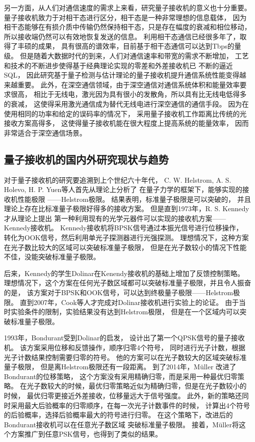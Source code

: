 另一方面，从人们对通信速度的需求上来看，研究量子接收机的意义也十分重要。
量子接收机致力于对相干态进行区分，相干态是一种非常理想的信息载体，
因为相干态能够在有损介质中传输仍然保持相干态，只是存在幅度的衰减和相位移动，
所以接收端仍然可以有效地恢复发送的信息。
利用相干态通信已经很多年了，取得了丰硕的成果，
具有很高的谱效率，目前基于相干态通信可以达到Tbps的量级\cite{jinno2007networks}。
但是随着大数据时代的到来，人们对通信速率和带宽的需求不断增加，
工艺和技术的不断进步使得基于经典理论实现的零差和外差接收机已
不断的逼近SQL\cite{tsukamoto2006unrepeated}，
因此研究基于量子检测与估计理论的量子接收机提升通信系统性能变得越来越重要。
此外，在深空通信领域，由于深空通信对通信系统体积和能量效率要求很高，
相比于无线电，激光因为具有很小的发散角，所以具有比无线电低得多的衰减，
这使得采用激光通信成为替代无线电进行深空通信的通信手段\cite{hemmati2006deep}。
因为在使用相同的功率和给定的误码率的情况下，
采用量子接收机工作距离比传统的光接收方案高得多\cite{helstrom1976quantum}，
这使得量子接收机能在很大程度上提高系统的能量效率，
因而非常适合于深空通信场景。



\subsection{量子接收机的国内外研究现状与趋势}
对于量子接收机的研究要追溯到上个世纪六十年代，
C. W. Helstrom, A. S. Holevo, H. P. Yuen等人首先从理论上分析了
在量子力学的框架下，能够实现的接收机性能极限
——Helstrom极限\cite{helstrom1976quantum,helstrom1967detection,yuen1970optimal,
yuen1975optimum,eldar2003designing}。
结果表明，标准量子极限是可以突破的，
并且理论上存在比标准量子极限好得多的接收方案。
但是直到1973年，R. S. Kennedy才从理论上提出
第一种利用现有的光学元器件可以实现的接收机方案——Kennedy接收机\cite{kennedy1973near}。
Kennedy接收机将BPSK信号通过本振光信号进行位移操作，
转化为OOK信号，然后利用单光子探测器进行光强探测。
理想情况下，这种方案在光子数比较大的区域可以突破标准量子极限，
但是在光子数较小的情况下性能不佳，没能突破标准量子极限。

后来，Kennedy的学生Dolinar在Kenendy接收机的基础上增加了反馈控制策略\cite{dolinar1973optimum}。
理想情况下，这个方案在任何光子数区域都可以突破标准量子极限，并且令人振奋的是，
该方案对于BPSK和OOK信号，可以达到终极量子极限——Helstrom极限。
直到2007年，Cook等人才完成对Dolinar接收机进行实验上的论证\cite{cook2007optical}。
由于当时实验条件的限制，实验结果没有达到Helstrom极限，
但是在一个区域内可以突破标准量子极限。

1993年，Bondurant受到Dolinar的启发，
设计出了第一个QPSK信号的量子接收机\cite{bondurant1993near}。
该方案采用位移和反馈操作，顺序归零4个符号，
同时进行光子计数，根据光子计数结果控制需要归零的符号。
他的方案可以在光子数较大的区域突破标准量子极限，
但是离Helstrom极限还有一段距离。
到了2014年，Müller 改进了Bondurant的位移策略，
这个方案没有采用精确归零，而是采用一种最优归零策略。
在光子数较大的时候，最优归零策略近似为精确归零，但是在光子数较小的时候，
最优归零更接近外差接收，位移量远大于信号强度。
此外，新的策略还同时采用最大后验概率的归零顺序，在每一次光子计数事件的时候，
计算出4个符号的后验概率，选择后验概率最大的符号进行归零。
在这个策略下，改进后的Bondurant接收机可以在任意光子数区域
突破标准量子极限\cite{muller2014qpsk}。
接着，Müller将这个方案推广到任意PSK信号，也得到了类似的结果\cite{muller2014m}。

